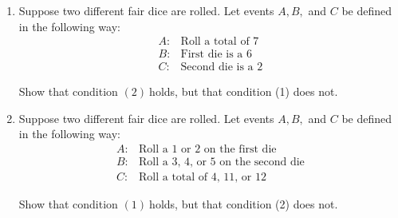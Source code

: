 \documentclass[12pt]{article}
\begin{document}
\begin{enumerate}
\begin{enumerate}
\item \label{} Suppose two different fair dice are rolled. Let events $A,B,$ and $C$
be defined in the following way:%
\begin{equation*}
\begin{array}{cl}
A: & \text{Roll a total of 7} \\ 
B: & \text{First die is a 6} \\ 
C: & \text{Second die is a 2}%
\end{array}%
\end{equation*}

Show that condition $(2)\ $holds, but that condition (1) does not.

\item Suppose two different fair dice are rolled. Let events $A,B,$ and $C$
be defined in the following way:%
\begin{equation*}
\begin{array}{cl}
A: & \text{Roll a 1 or 2 on the first die} \\ 
B: & \text{Roll a 3, 4, or 5 on the second die} \\ 
C: & \text{Roll a total of 4, 11, or 12}%
\end{array}%
\end{equation*}

Show that condition $(1)\ $holds, but that condition (2) does not.
\end{enumerate}  %






\end{enumerate}
\end{document}
